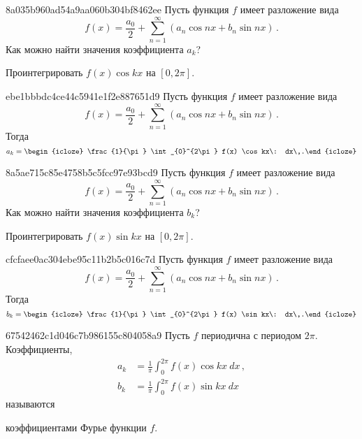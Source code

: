 \begin{note}{8a035b960ad54a9aa060b304bf8462ee}
    Пусть функция \({ f }\) имеет разложение вида
    \[
        f(x) = \frac{a_0}{2} + \sum_{n=1}^{\infty} (a_n \cos nx + b_n \sin nx)\,.
    \]
    Как можно найти значения коэффициента \({ a_k }\)?

    \begin{cloze}{1}
        Проинтегрировать \({ f(x) \cos kx }\) на \({ [0, 2\pi] }\).
    \end{cloze}
\end{note}

\begin{note}{ebe1bbbdc4ce44c5941e1f2e887651d9}
    Пусть функция \({ f }\) имеет разложение вида
    \[
        f(x) = \frac{a_0}{2} + \sum_{n=1}^{\infty} (a_n \cos nx + b_n \sin nx)\,.
    \]
    Тогда
    \[
        a_k = \begin{icloze}{1}\frac{1}{\pi} \int_{0}^{2\pi} f(x) \cos kx\: dx\,.\end{icloze}
    \]
\end{note}

\begin{note}{8a5ae715c85e4758b5c5fcc97e93bcd9}
    Пусть функция \({ f }\) имеет разложение вида
    \[
        f(x) = \frac{a_0}{2} + \sum_{n=1}^{\infty} (a_n \cos nx + b_n \sin nx)\,.
    \]
    Как можно найти значения коэффициента \({ b_k }\)?

    \begin{cloze}{1}
        Проинтегрировать \({ f(x) \sin kx }\) на \({ [0, 2\pi] }\).
    \end{cloze}
\end{note}

\begin{note}{cfcfaee0ac304ebe95c11b2b5c016c7d}
    Пусть функция \({ f }\) имеет разложение вида
    \[
        f(x) = \frac{a_0}{2} + \sum_{n=1}^{\infty} (a_n \cos nx + b_n \sin nx)\,.
    \]
    Тогда
    \[
        b_k = \begin{icloze}{1}\frac{1}{\pi} \int_{0}^{2\pi} f(x) \sin kx\: dx\,.\end{icloze}
    \]
\end{note}

\begin{note}{67542462c1d046c7b986155c804058a9}
    Пусть \({ f }\) периодична с периодом \({ 2\pi }\).
    Коэффициенты,
    \begin{align*}
        a_k &= \frac{1}{\pi} \int_{0}^{2\pi} f(x) \cos kx\: dx\,, \\
        b_k &= \frac{1}{\pi} \int_{0}^{2\pi} f(x) \sin kx\: dx
    \end{align*}
    называются \begin{icloze}{1}коэффициентами Фурье функции \({ f }\).\end{icloze}
\end{note}

